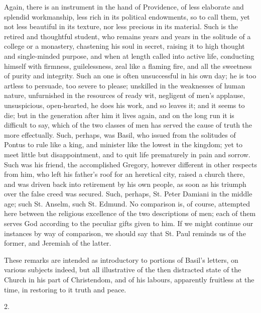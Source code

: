 Again, there is an instrument in the hand of Providence, of less
elaborate and splendid workmanship, less rich in its political
endowments, so to call them, yet not less beautiful in its texture,
nor less precious in its material. Such is the retired and thoughtful
student, who remains years and years in the solitude of a college or a
monastery, chastening his soul in secret, raising it to high thought
and single-minded purpose, and when at length called into active life,
conducting himself with firmness, guilelessness, zeal like a flaming
fire, and all the sweetness of purity and integrity. Such an one is
often unsuccessful in his own day; he is too artless to persuade, too
severe to please; unskilled in the weaknesses of human nature,
unfurnished in the resources of ready wit, negligent of men's
applause, unsuspicious, open-hearted, he does his work, and so leaves
it; and it seems to die; but in the generation after him it lives
again, and on the long run it is difficult to say, which of the two
classes of men has served the cause of truth the more effectually.
Such, perhaps, was Basil, who issued from the solitudes of Pontus to
rule like a king, and minister like the lowest in the kingdom; yet to
meet little but disappointment, and to quit life prematurely in pain
and sorrow. Such was his friend, the accomplished Gregory, however
different in other respects from him, who left his father's roof for
an heretical city, raised a church there, and was driven back into
retirement by his own people, as soon as his triumph over the false
creed was secured. Such, perhaps, St. Peter Damiani in the middle age;
such St. Anselm, such St. Edmund. No comparison is, of course,
attempted here between the religious excellence of the two
descriptions of men; each of them serves God according to the peculiar
gifts given to him. If we might continue our instances by way of
comparison, we should say that St. Paul reminds us of the former, and
Jeremiah of the latter.

These remarks are intended as introductory to portions of Basil's
letters, on various subjects indeed, but all illustrative of the then
distracted state of the Church in his part of Christendom, and of his
labours, apparently fruitless at the time, in restoring to it truth
and peace.

2.

